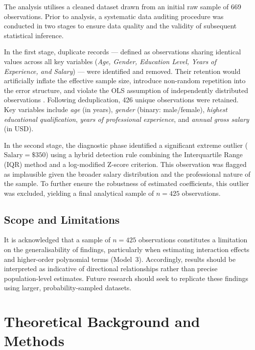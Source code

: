 \documentclass[12pt, a4paper]{article}
\begin{document}
The analysis utilises a cleaned dataset drawn from an initial raw sample of 669 observations. Prior to analysis, a systematic data auditing procedure was conducted in two stages to ensure data quality and the validity of subsequent statistical inference.

In the first stage, duplicate records --- defined as observations sharing identical values across all key variables (\textit{Age, Gender, Education Level, Years of Experience, and Salary}) --- were identified and removed. Their retention would artificially inflate the effective sample size, introduce non-random repetition into the error structure, and violate the OLS assumption of independently distributed observations \citep{wooldridge2010}. Following deduplication, 426 unique observations were retained. Key variables include \textit{age} (in years), \textit{gender} (binary: male/female), \textit{highest educational qualification}, \textit{years of professional experience}, and \textit{annual gross salary} (in USD).

In the second stage, the diagnostic phase identified a significant extreme outlier ($ \text{Salary} = \$350 $) using a hybrid detection rule combining the Interquartile Range (IQR) method and a log-modified Z-score criterion. This observation was flagged as implausible given the broader salary distribution and the professional nature of the sample. To further ensure the robustness of estimated coefficients, this outlier was excluded, yielding a final analytical sample of \textbf{$ n = 425 $} observations.

\subsection{Scope and Limitations}

It is acknowledged that a sample of $n = 425$ observations constitutes a limitation on
the generalisability of findings, particularly when estimating interaction effects and
higher-order polynomial terms (Model~3). Accordingly, results should be interpreted as
indicative of directional relationships rather than precise population-level estimates.
Future research should seek to replicate these findings using larger, probability-sampled
datasets.

\section{Theoretical Background and Methods}
\end{document}
